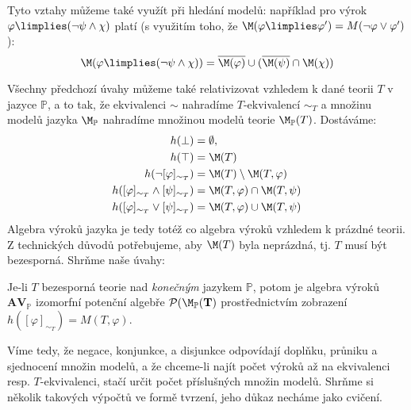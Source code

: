 \begin{remark}
Tyto vztahy můžeme také využít při hledání modelů: například pro výrok $\varphi\limplies(\neg\psi\land\chi)$ platí (s využitím toho, že $\M(\varphi\limplies\varphi')=M(\neg\varphi\lor\varphi')$):
$$
\M(\varphi\limplies(\neg\psi\land\chi))=\overline{\M(\varphi)}\cup(\overline{\M(\psi)}\cap\M(\chi))
$$
\end{remark}

Všechny předchozí úvahy můžeme také relativizovat vzhledem k dané teorii $T$ v jazyce $\mathbb P$, a to tak, že ekvivalenci $\sim$ nahradíme $T$-ekvivalencí $\sim_T$ a množinu modelů jazyka $\M_\mathbb P$ nahradíme množinou modelů teorie $\M_\mathbb P(T)$. Dostáváme:
\begin{align*}
    h(\bot)&=\emptyset,\\
    h(\top)&=\M(T)\\
    h(\neg[\varphi]_{\sim_T})&=\M(T)\setminus\M(T,\varphi)\\
    h([\varphi]_{\sim_T}\land[\psi]_{\sim_T})&=\M(T,\varphi)\cap\M(T,\psi)\\
    h([\varphi]_{\sim_T}\lor[\psi]_{\sim_T})&=\M(T,\varphi)\cup\M(T,\psi)
\end{align*}
Algebra výroků jazyka je tedy totéž co algebra výroků vzhledem k prázdné teorii. Z technických důvodů potřebujeme, aby $\M(T)$ byla neprázdná, tj. $T$ musí být bezesporná. Shrňme naše úvahy:
\begin{corollary}
Je-li $T$ bezesporná teorie nad \emph{konečným} jazykem $\mathbb P$, potom je algebra výroků   $\mathbf{AV}_\mathbb P$ izomorfní potenční algebře $\mathbf{\mathcal P(\M_\mathbb P(T)}$ prostřednictvím zobrazení $h([\varphi]_{\sim_T})=M(T,\varphi)$.
\end{corollary}

Víme tedy, že negace, konjunkce, a disjunkce odpovídají doplňku, průniku a sjednocení množin modelů, a že chceme-li najít počet výroků až na ekvivalenci resp. $T$-ekvivalenci, stačí určit počet příslušných množin modelů. Shrňme si několik takových výpočtů ve formě tvrzení, jeho důkaz necháme jako cvičení.

